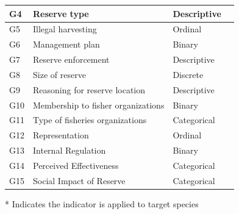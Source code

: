\documentclass[10pt,letterpaper]{article}
\begin{document}
\begin{table}[!ht]
{\begin{tabular}{l|l|l|l}
\hline
\hspace{1em}G4 & Reserve type & Descriptive & \\
\hline
\hspace{1em}G5 & Illegal harvesting & Ordinal & \\
\hline
\hspace{1em}G6 & Management plan & Binary & \\
\hline
\hspace{1em}G7 & Reserve enforcement & Descriptive & \\
\hline
\hspace{1em}G8 & Size of reserve & Discrete & \\
\hline
\hspace{1em}G9 & Reasoning for reserve location & Descriptive & \\
\hline
\hspace{1em}G10 & Membership to fisher organizations & Binary & \\
\hline
\hspace{1em}G11 & Type of fisheries organizations & Categorical & \\
\hline
\hspace{1em}G12 & Representation & Ordinal & \\
\hline
\hspace{1em}G13 & Internal Regulation & Binary & \\
\hline
\hspace{1em}G14 & Perceived Effectiveness & Categorical & \\
\hline
\hspace{1em}G15 & Social Impact of Reserve & Categorical & \\
\hline
\end{tabular}}
\begin{flushleft} * Indicates the indicator is applied to target species
\end{flushleft}
\label{table1}
\end{table}
\end{document}
